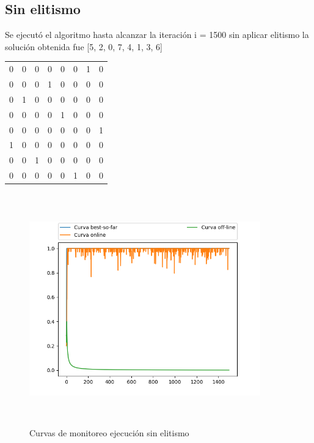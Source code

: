 \documentclass[11pt]{article}
\begin{document}
\subsection{Sin elitismo}
Se ejecut\'o el algoritmo hasta alcanzar la iteraci\'on i = 1500 sin aplicar elitismo la soluci\'on obtenida fue [5, 2, 0, 7, 4, 1, 3, 6]

\begin{center}
\begin{tabular}{ c c c c c c c c }
	0 & 0 & 0 & 0 & 0 & 0 & 1 & 0\\
	0 & 0 & 0 & 1 & 0 & 0 & 0 & 0\\
	0 & 1 & 0 & 0 & 0 & 0 & 0 & 0\\
	0 & 0 & 0 & 0 & 1 & 0 & 0 & 0\\
	0 & 0 & 0 & 0 & 0 & 0 & 0 & 1\\
	1 & 0 & 0 & 0 & 0 & 0 & 0 & 0\\
	0 & 0 & 1 & 0 & 0 & 0 & 0 & 0\\
	0 & 0 & 0 & 0 & 0 & 1 & 0 & 0
\end{tabular}
\end{center}
\begin{figure}[h]
    \includegraphics[width=10cm, height=10cm]{Figure_2}
    \centering
    \caption{Curvas de monitoreo ejecuci\'on sin elitismo}
    \label{sinelitismo}
    \end{figure}
\end{document}
